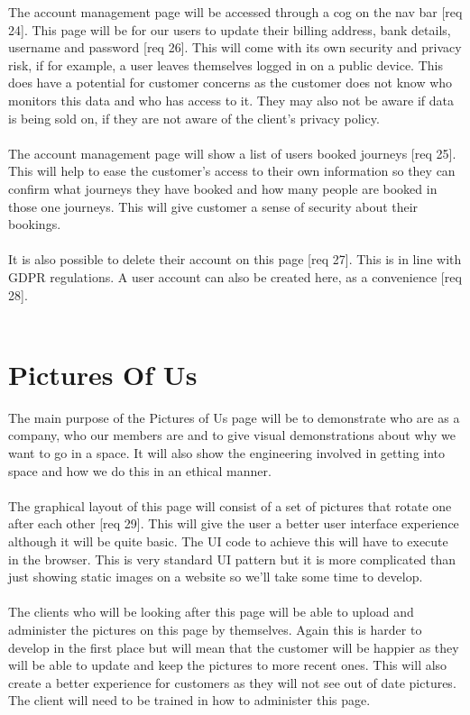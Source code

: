\documentclass{article}
\begin{document}
The account management page will be accessed through a cog on the nav bar [req 24]. This page will be for our users to update their billing address, bank details, username and password [req 26]. This will come with its own security and privacy risk, if for example, a user leaves themselves logged in on a public device. This does have a potential for customer concerns as the customer does not know who monitors this data and who has access to it. They may also not be aware if data is being sold on, if they are not aware of the client's privacy policy.
\\
\\
The account management page will show a list of users booked journeys [req 25]. This will help to ease the customer's access to their own information so they can confirm what journeys they have booked and how many people are booked in those one journeys. This will give customer a sense of security about their bookings.
\\
\\
It is also possible to delete their account on this page [req 27]. This is in line with GDPR regulations. A user account can also be created here, as a convenience [req 28].
\\
\\

\section{Pictures Of Us}

The main purpose of the Pictures of Us page will be to demonstrate who are as a company, who our members are and to give visual demonstrations about why we want to go in a space. It will also show the engineering involved in getting into space and how we do this in an ethical manner.
\\
\\
The graphical layout of this page will consist of a set of pictures that rotate one after each other [req 29]. This will give the user a better user interface experience although it will be quite basic. The UI code to achieve this will have to execute in the browser. This is very standard UI pattern but it is more complicated than just showing static images on a website so we'll take some time to develop.
\\
\\
The clients who will be looking after this page will be able to upload and administer the pictures on this page by themselves. Again this is harder to develop in the first place but will mean that the customer will be happier as they will be able to update and keep the pictures to more recent ones. This will also create a better experience for customers as they will not see out of date pictures. The client will need to be trained in how to administer this page.
\\
\\
\end{document}
